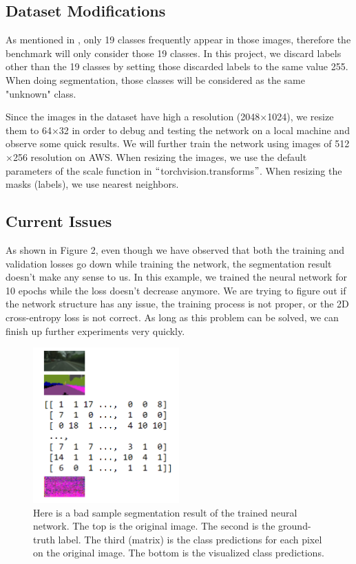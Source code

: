 \documentclass[10pt,twocolumn,letterpaper]{article}
\begin{document}
\subsection{Dataset Modifications}
As mentioned in \cite{Cordts2016Cityscapes}, only 19 classes frequently appear in those images, therefore the benchmark will only consider those 19 classes. In this project, we discard labels other than the 19 classes by setting those discarded labels to the same value 255. When doing segmentation, those classes will be considered as the same "unknown" class.

Since the images in the dataset have high a resolution (2048$\times$1024), we resize them to 64$\times$32 in order to debug and testing the network on a local machine and observe some quick results. We will further train the network using images of 512$\times$256 resolution on AWS. When resizing the images, we use the default parameters of the scale function in $``$torchvision.transforms$"$. When resizing the masks (labels), we use nearest neighbors.

\subsection{Current Issues}
As shown in Figure 2, even though we have observed that both the training and validation losses go down while training the network, the segmentation result doesn't make any sense to us. In this example, we trained the neural network for 10 epochs while the loss doesn't decrease anymore. We are trying to figure out if the network structure has any issue, the training process is not proper, or the 2D cross-entropy loss is not correct. As long as this problem can be solved, we can finish up further experiments very quickly.

\begin{figure}[t]
	\centering
	\includegraphics[width=0.50\textwidth]{bad_result.PNG}
	\caption{Here is a bad sample segmentation result of the trained neural network. The top is the original image. The second is the ground-truth label. The third (matrix) is the class predictions for each pixel on the original image. The bottom is the visualized class predictions.}
	\label{fig:leadfigure}
\end{figure}

{\small


}
\end{document}
